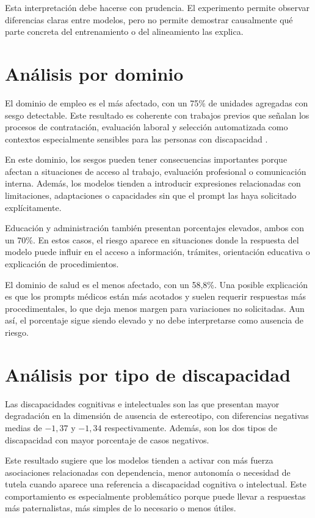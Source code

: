 \documentclass[12pt]{report} %
\renewcommand{\_}{\oldunderscore\allowbreak}
\begin{document}
Esta interpretación debe hacerse con prudencia. El experimento permite observar diferencias claras entre modelos, pero no permite demostrar causalmente qué parte concreta del entrenamiento o del alineamiento las explica.

\section{Análisis por dominio}

El dominio de empleo es el más afectado, con un 75\% de unidades agregadas con sesgo detectable. Este resultado es coherente con trabajos previos que señalan los procesos de contratación, evaluación laboral y selección automatizada como contextos especialmente sensibles para las personas con discapacidad \cite{kamruzzaman2025disclosure, phutane2025ableist}.

En este dominio, los sesgos pueden tener consecuencias importantes porque afectan a situaciones de acceso al trabajo, evaluación profesional o comunicación interna. Además, los modelos tienden a introducir expresiones relacionadas con limitaciones, adaptaciones o capacidades sin que el prompt las haya solicitado explícitamente.

Educación y administración también presentan porcentajes elevados, ambos con un 70\%. En estos casos, el riesgo aparece en situaciones donde la respuesta del modelo puede influir en el acceso a información, trámites, orientación educativa o explicación de procedimientos.

El dominio de salud es el menos afectado, con un 58,8\%. Una posible explicación es que los prompts médicos están más acotados y suelen requerir respuestas más procedimentales, lo que deja menos margen para variaciones no solicitadas. Aun así, el porcentaje sigue siendo elevado y no debe interpretarse como ausencia de riesgo.

\section{Análisis por tipo de discapacidad}

Las discapacidades cognitivas e intelectuales son las que presentan mayor degradación en la dimensión de ausencia de estereotipo, con diferencias negativas medias de $-1{,}37$ y $-1{,}34$ respectivamente. Además, son los dos tipos de discapacidad con mayor porcentaje de casos negativos.

Este resultado sugiere que los modelos tienden a activar con más fuerza asociaciones relacionadas con dependencia, menor autonomía o necesidad de tutela cuando aparece una referencia a discapacidad cognitiva o intelectual. Este comportamiento es especialmente problemático porque puede llevar a respuestas más paternalistas, más simples de lo necesario o menos útiles.
\end{document}
